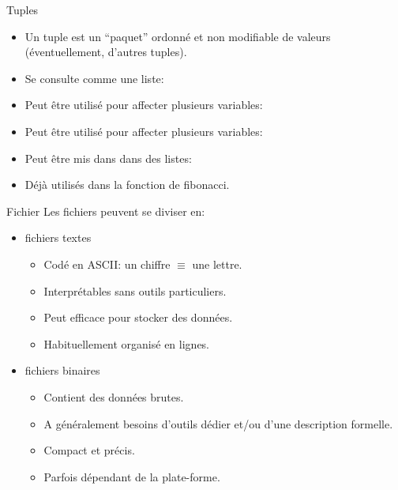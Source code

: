 \documentclass{beamer}
\begin{document}
\begin{frame}{Tuples}
  \begin{itemize}
  \item Un tuple est un ``paquet'' ordonné et non modifiable de valeurs (éventuellement, d'autres tuples).
    \newline{}
  \item Se consulte comme une liste:
    \newline{}
  \item  Peut être utilisé pour affecter plusieurs variables:
    \newline{}
  \item Peut être utilisé pour affecter plusieurs variables:
    \newline{}
  \item Peut être mis dans dans des listes:
    \newline{}
  \item Déjà utilisés dans la fonction de fibonacci.
  \end{itemize}
\end{frame}

\begin{frame}{Fichier}
  Les fichiers peuvent se diviser en:
  \begin{itemize}
    \item fichiers textes
      \begin{itemize}
      \item Codé en ASCII: un chiffre $\equiv$ une lettre.
      \item Interprétables sans outils particuliers.
      \item Peut efficace pour stocker des données.
      \item Habituellement organisé en lignes.
      \end{itemize}
    \item fichiers binaires
      \begin{itemize}
      \item Contient des données brutes.
      \item A généralement besoins d'outils dédier et/ou d'une description formelle.
      \item Compact et précis.
      \item Parfois dépendant de la plate-forme.
      \end{itemize}
  \end{itemize}
\end{frame}
\end{document}
